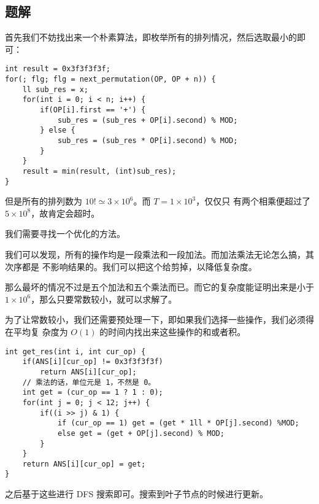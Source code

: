 \subsection{题解}
\begin{frame}[fragile]
首先我们不妨找出来一个朴素算法，即枚举所有的排列情况，然后选取最小的即可：
\begin{lstlisting}[style=C++]
int result = 0x3f3f3f3f;
for(; flg; flg = next_permutation(OP, OP + n)) {
    ll sub_res = x;
    for(int i = 0; i < n; i++) {
        if(OP[i].first == '+') {
            sub_res = (sub_res + OP[i].second) % MOD;
        } else {
            sub_res = (sub_res * OP[i].second) % MOD;
        }
    }
    result = min(result, (int)sub_res);
}
\end{lstlisting}
\end{frame}


\begin{frame} %
但是所有的排列数为 $10! \simeq 3 \times 10^6$。而 $T = 1 \times 10 ^ 3$，仅仅只
有两个相乘便超过了 $5 \times 10^8$，故肯定会超时。

我们需要寻找一个优化的方法。
\end{frame}


\begin{frame}
我们可以发现，所有的操作均是一段乘法和一段加法。而加法乘法无论怎么搞，其次序都是
不影响结果的。我们可以把这个给剪掉，以降低复杂度。

那么最坏的情况不过是五个加法和五个乘法而已。而它的复杂度能证明出来是小于 $1
\times 10^6$，那么只要常数较小，就可以求解了。
\end{frame}

\begin{frame}
为了让常数较小，我们还需要预处理一下，即如果我们选择一些操作，我们必须得在平均复
杂度为 $O(1)$ 的时间内找出来这些操作的和或者积。
\end{frame}


\begin{frame}[fragile]
\begin{lstlisting}[style=C++]
int get_res(int i, int cur_op) {
    if(ANS[i][cur_op] != 0x3f3f3f3f)
        return ANS[i][cur_op];
    // 乘法的话，单位元是 1，不然是 0。
    int get = (cur_op == 1 ? 1 : 0);
    for(int j = 0; j < 12; j++) {
        if((i >> j) & 1) {
            if (cur_op == 1) get = (get * 1ll * OP[j].second) %MOD;
            else get = (get + OP[j].second) % MOD;
        }
    }
    return ANS[i][cur_op] = get;
}
\end{lstlisting}
\end{frame}


\begin{frame}
之后基于这些进行 DFS 搜索即可。搜索到叶子节点的时候进行更新。
\end{frame}
